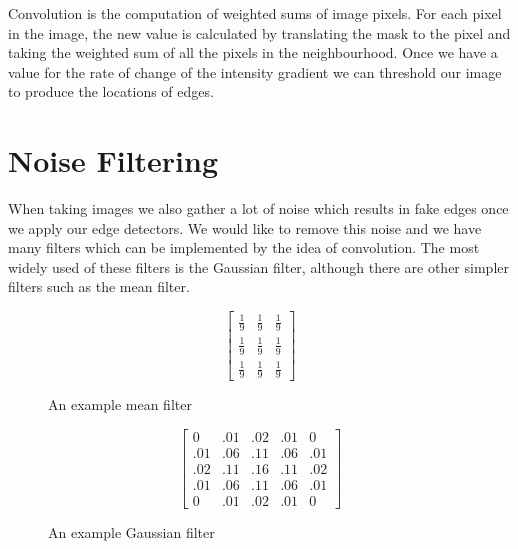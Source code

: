 \documentclass{article}
\begin{document}
	Convolution is the computation of weighted sums of image pixels. For each pixel in the image, the new value is calculated by translating the mask to the pixel and taking the weighted sum of all the pixels in the neighbourhood. Once we have a value for the rate of change of the intensity gradient we can threshold our image to produce the locations of edges.
	
	\section{Noise Filtering}
	When taking images we also gather a lot of noise which results in fake edges once we apply our edge detectors. We would like to remove this noise and we have many filters which can be implemented by the idea of convolution. The most widely used of these filters is the Gaussian filter, although there are other simpler filters such as the mean filter.
	\begin{figure}[ht]
	\begin{minipage}{.5\textwidth}
			\begingroup
			\renewcommand*{\arraystretch}{1.7}	
			\centering
			\[ \begin{bmatrix} \frac{1}{9} & \frac{1}{9} & \frac{1}{9} \\
								\frac{1}{9} & \frac{1}{9} & \frac{1}{9} \\
								\frac{1}{9} & \frac{1}{9} & \frac{1}{9}
			\end{bmatrix} \]
			\endgroup
			\caption{An example mean filter}
			\label{fig:mean filter}
	\end{minipage}
	\begin{minipage}{.5\textwidth}
		\centering
		\[ \begin{bmatrix} 0 & .01 & .02 & .01 & 0 \\
								.01 & .06 & .11 & .06 & .01 \\ 
							    .02 & .11 & .16 & .11 & .02 \\
							    .01 & .06 & .11 & .06 & .01 \\
							    0 & .01 & .02 & .01 & 0
				\end{bmatrix} \]
		\caption{An example Gaussian filter}
		\label{fig:gaussian filter}

	\end{minipage}
	\end{figure}
	
\end{document}
